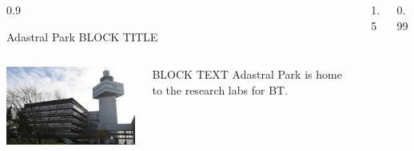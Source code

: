 \documentclass[final]{beamer}
\theoremstyle{plain}
\theoremstyle{definition}
\theoremstyle{remark}
\newlength{\sepwid}
\newlength{\onecolwid}
\newlength{\twocolwid}
\begin{document}
\begin{frame}[t]
\begin{columns}[t]
\begin{column}{0.9\onecolwid}
    \begin{mdframed}[backgroundcolor=white, userdefinedwidth=0.999999\linewidth]
    \centering
    \center
    \end{mdframed}
    \vspace{1.5cm}
\begin{block}{
Adastral Park BLOCK TITLE}
\begin{columns}
\begin{column}{0.6\linewidth}
\includegraphics[scale=2]{AdastralPark.jpeg} \\ \end{column}
\begin{column}{0.3\linewidth}
BLOCK TEXT
Adastral Park is home to the research labs for BT.
\end{column}
\end{columns}
 \vspace{1cm}
\end{block}


\end{column} %

\begin{column}{1.5\sepwid}\end{column} %

\begin{column}{0.99\twocolwid} %

\begin{mdframed}[backgroundcolor=white, userdefinedwidth=0.999999\linewidth]
    \centering
    \center
  

\end{mdframed}
\end{column}
\end{columns}
\end{frame}
\end{document}
